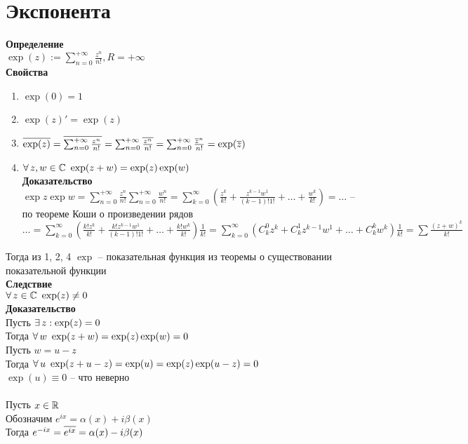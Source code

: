 \documentclass[12pt]{article}
\begin{document}
\section{Экспонента}
\textbf{Определение}\\
$\exp(z) := \sum_{n=0}^{+\infty} \frac{z^n}{n!}, R = +\infty$\\
\textbf{Свойства}
\begin{enumerate}
    \item $\exp(0) = 1$
    \item $\exp(z)' = \exp(z)$
    \item $\overline{\exp(z)} = \overline{\sum_{n=0}^{+\infty} \frac{z^n}{n!}} = \sum_{n=0}^{+\infty} \overline{\frac{z^n}{n!}} = \sum_{n=0}^{+\infty} \frac{\overline{z}^n}{n!} = \exp(\overline z)$
    \item $\forall\, z, w \in \mathbb{C}\ \exp(z+w) = \exp(z)\exp(w)$\\
    \textbf{Доказательство}\\
    $\exp z \exp w = \sum_{n=0}^{+\infty} \frac{z^n}{n!} \sum_{n=0}^{+\infty} \frac{w^n}{n!} = \sum_{k=0}^{\infty} (\frac{z^k}{k!} + \frac{z^{k-1}w^1}{(k-1)!1!} + \ldots + \frac{w^k}{k!}) = \ldots$ -- по теореме Коши о произведении рядов\\
    $\ldots = \sum_{k=0}^{\infty} (\frac{k!z^k}{k!} + \frac{k!z^{k-1}w^1}{(k-1)!1!} + \ldots + \frac{k!w^k}{k!})\frac1{k!} = \sum_{k=0}^{\infty} (C_k^0 z^k + C_k^1 z^{k-1}w^1 + \ldots + C_k^k w^k)\frac1{k!} = \sum \frac{(z+w)^k}{k!}$
\end{enumerate}
Тогда из 1, 2, 4 $\exp$ -- показательная функция из теоремы о существовании показательной функции\\
\textbf{Следствие}\\
$\forall\, z\in \mathbb{C}\ \exp(z) \neq 0$\\
\textbf{Доказательство}\\
Пусть $\exists\, z: \exp(z) = 0$\\
Тогда $\forall\, w\ \exp(z+w) = \exp(z)\exp(w) = 0$\\
Пусть $w = u-z$\\
Тогда $\forall\, u\ \exp(z+u-z) = \exp(u) = \exp(z)\exp(u-z) = 0$\\
$\exp(u) \equiv 0$ -- что неверно\\\\
Пусть $x\in \mathbb{R}$\\
Обозначим $e^{ix} = \alpha(x) + i\beta(x)$\\
Тогда $e^{-ix} = \overline{e^{ix}} = \alpha(x) - i\beta(x)$\\
\end{document}
